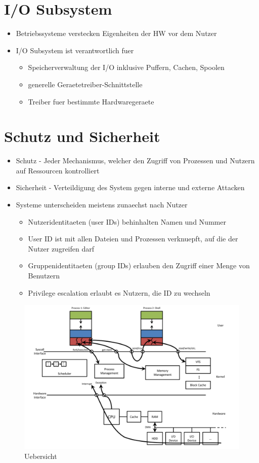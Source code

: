 \documentclass[a4paper]{scrreprt}
\begin{document}
\section{I/O Subsystem}
\begin{itemize}
	\item Betriebssysteme verstecken Eigenheiten der HW vor dem Nutzer
	\item I/O Subsystem ist verantwortlich fuer
		\begin{itemize}
			\item Speicherverwaltung der I/O inklusive Puffern, Cachen, Spoolen
			\item generelle Geraetetreiber-Schnittstelle
			\item Treiber fuer bestimmte Hardwaregeraete
		\end{itemize}
\end{itemize}

\section{Schutz und Sicherheit}
\begin{itemize}
	\item Schutz - Jeder Mechanismus, welcher den Zugriff von Prozessen und Nutzern auf Ressourcen kontrolliert
	\item Sicherheit - Verteildigung des System gegen interne und externe Attacken
	\item Systeme unterscheiden meistens zunaechst nach Nutzer
		\begin{itemize}
			\item Nutzeridentitaeten (user IDs) behinhalten Namen und Nummer
			\item User ID ist mit allen Dateien und Prozessen verknuepft, auf die der Nutzer zugreifen darf
			\item Gruppenidentitaeten (group IDs) erlauben den Zugriff einer Menge von Benutzern
			\item Privilege escalation erlaubt es Nutzern, die ID zu wechseln
		\end{itemize}
\end{itemize}

\begin{figure}[ht]
\centering
\includegraphics[scale=0.5]{graphics/big_picture.png}
\caption{Uebersicht}
\end{figure}
\end{document}
